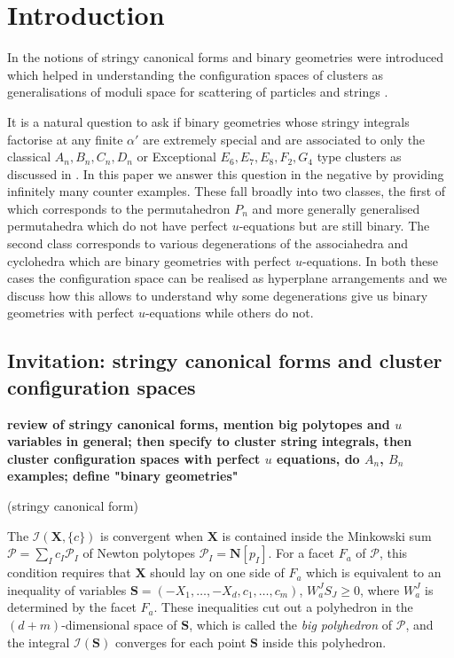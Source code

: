 \documentclass[hidelinks,12pt]{article}
\begin{document}
\vfill \eject



\baselineskip=18pt

\tableofcontents

\newpage
\section{Introduction}
In \cite{} the notions of stringy canonical forms and binary geometries were introduced which helped in understanding the configuration spaces of clusters as generalisations of moduli space for scattering of particles and strings . 

It is a natural question to ask if binary geometries whose stringy integrals factorise at any finite $\alpha'$ are extremely special and are associated to only the classical $A_n, B_n, C_n,D_n$ or  Exceptional $E_6, E_7, E_8, F_2, G_4$  type clusters  as discussed in \cite{}. In this paper we answer this question in the negative by providing infinitely many counter examples. These fall broadly into two classes, the first of which corresponds to the permutahedron $P_n$ and more generally generalised permutahedra which do not have perfect $u$-equations but are still binary. The second class corresponds to various degenerations of the associahedra and cyclohedra which are binary geometries with perfect $u$-equations. In both these cases the configuration space can be realised as hyperplane arrangements and we discuss how this allows to understand why some degenerations give us binary geometries with perfect $u$-equations while others do not.

\subsection{Invitation: stringy canonical forms and cluster configuration spaces}

{\bf review of stringy canonical forms, mention big polytopes and $u$ variables in general; then specify to cluster string integrals, then cluster configuration spaces with perfect $u$ equations, do $A_n$, $B_n$ examples; define "binary geometries"}


(stringy canonical form)

The $\mathcal I(\mathbf X,\{c\})$ is convergent when $\mathbf X$ is contained inside
the Minkowski sum $\mathcal P=\sum_I c_I \mathcal P_I$ of Newton polytopes 
$\mathcal P_I=\mathbf N[p_I]$. For a facet $F_a$ of $\mathcal P$, this condition 
requires that $\mathbf X$ should lay on one side of $F_a$ which is equivalent to 
an inequality of variables $\mathbf S=(-X_1,\dots,-X_d,c_1,\dots,c_m)$, 
$W_a^JS_J\geq 0$, where $W_a^J$ is determined by the facet $F_a$. 
These inequalities cut out a polyhedron in the $(d+m)$-dimensional space of $\mathbf S$,
which is called the \textit{big polyhedron} of $\mathcal P$, 
and the integral $\mathcal I(\mathbf S)$ converges for each point $\mathbf S$ 
inside this polyhedron.
\end{document}

